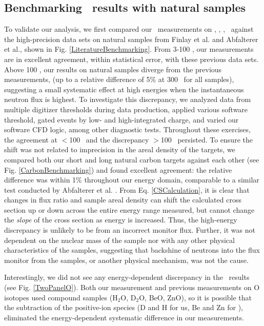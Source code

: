 \subsection{Benchmarking \tot\ results with natural samples}
To validate our analysis, we first compared our \tot\ measurements on \cNat,
\niNat, \snNat, \pbNat\ against the high-precision data sets on natural samples from 
Finlay et al.\cite{Finlay1993} and Abfalterer et al.\cite{Abfalterer2001}, shown in Fig.
\ref{LiteratureBenchmarking}. From 3-100 \mega\electronvolt, our measurements are in excellent
agreement, within statistical error, with these previous data sets. Above 100 \mega\electronvolt, our results 
on natural samples diverge from the previous measurements,
(up to a relative difference of 5\% at 300 \mega\electronvolt\ for all 
samples), suggesting a small systematic effect at high energies when the instantaneous neutron 
flux is highest. To investigate this discrepancy, we analyzed data from multiple digitizer 
thresholds during data production, applied various software threshold, gated events by low- 
and high-integrated charge, and varied our software CFD logic, among other diagnostic tests. 
Throughout these exercises, the agreement
at $<$100 \mega\electronvolt\ and the discrepancy $>$100 \mega\electronvolt\ persisted.
To ensure the shift was not related to imprecision in the areal
density of the targets, we compared both our short and long natural carbon targets against 
each other (see Fig. \ref{CarbonBenchmarking}) and found excellent agreement: the relative 
difference was within 1\% throughout our energy domain, comparable to a similar test
conducted by Abfalterer et al. \cite{Abfalterer2001}. From Eq. \ref{CSCalculation},
it is clear that changes in flux ratio and sample areal
density can shift the calculated cross section up or down across the entire
energy range measured, but cannot change the \textit{slope} of the cross section
as energy is increased. Thus, the high-energy discrepancy is unlikely to be from
an incorrect monitor flux. Further, it was not dependent on the nuclear mass of
the sample nor with any other physical characteristics of the samples,
suggesting that backshine of neutrons into the flux monitor from the samples, or another 
physical mechanism, was not the cause.

Interestingly, we did not see any energy-dependent 
discrepancy in the \oSix\ results (see Fig. \ref{TwoPanelO}). Both our measurement and previous
measurements on O isotopes used compound samples (H$_{2}$O, D$_{2}$O, BeO, ZnO), so it is possible 
that the subtraction of the positive-ion species (D and H for us, Be and Zn for \cite{Finlay1993}), 
eliminated the energy-dependent systematic difference in our measurements.

